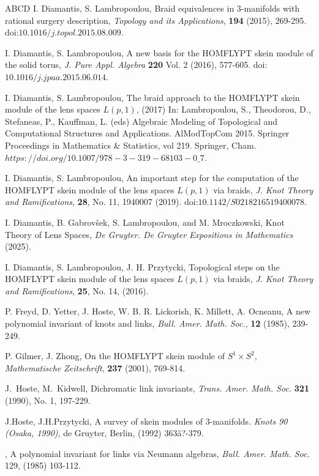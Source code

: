 \documentclass[11pt]{amsart}
\begin{document}
\begin{thebibliography}{ABCD}
 {\sc I. Diamantis, S. Lambropoulou}, Braid equivalences in 3-manifolds 
with rational surgery description, {\em Topology and its Applications}, {\bf 194} (2015), 269-295. doi:$10.1016/j.topol.2015.08.009$.

 {\sc I. Diamantis, S. Lambropoulou}, A new basis for the HOMFLYPT skein module of the solid torus, {\em J. Pure Appl. Algebra} {\bf 220} Vol. 2 (2016), 577-605. doi:$10.1016/j.jpaa.2015.06.014$.

 {\sc I. Diamantis, S. Lambropoulou}, The braid approach to the HOMFLYPT skein module of the lens spaces $L(p, 1)$, (2017) In: Lambropoulou, S., Theodorou, D., Stefaneas, P., Kauffman, L. (eds) Algebraic Modeling of Topological and Computational Structures and Applications. AlModTopCom 2015. Springer Proceedings in Mathematics \& Statistics, vol 219. Springer, Cham. $https://doi.org/10.1007/978-3-319-68103-0\_7$.

 {\sc I. Diamantis, S. Lambropoulou}, An important step for the computation of the HOMFLYPT skein module of the lens spaces $L(p,1)$ via braids, {\em J. Knot Theory and Ramifications}, {\bf 28}, No. 11, 1940007 (2019). doi:$10.1142/S0218216519400078$.

 {\sc I. Diamantis, B. Gabrov\v sek, S. Lambropoulou, and M. Mroczkowski}, Knot Theory of Lens Spaces, {\em De Gruyter. De Gruyter Expositions in Mathematics} (2025).

 {\sc I. Diamantis, S. Lambropoulou, J. H. Przytycki}, Topological steps on the HOMFLYPT skein module of the lens spaces $L(p,1)$ via braids, {\it J. Knot Theory and Ramifications}, {\bf 25}, No. 14, (2016).

 {\sc P. Freyd, D. Yetter, J. Hoste, W. B. R. Lickorish, K. Millett, A. Ocneanu}, A new polynomial invariant of knots and links, {\em Bull. Amer. Math. Soc.}, {\bf 12} (1985), 239-249.

 {\sc P. Gilmer, J. Zhong}, On the HOMFLYPT skein module of $S^1\times S^2$, {\em Mathematische Zeitschrift}, {\bf 237} (2001), 769-814.

 {\sc J.~Hoste, M.~Kidwell}, Dichromatic link invariants, {\it Trans. Amer. Math. Soc.} {\bf 321} (1990), No. 1, 197-229.

 {\sc J.Hoste, J.H.Przytycki}, A survey of skein modules of 3-manifolds. {\it Knots 90 (Osaka, 1990)}, de Gruyter, Berlin, (1992) 363â?-379.

, A polynomial invariant for links via Neumann algebras, {\it Bull. Amer. Math. Soc.} {129},
(1985) 103-112.


\end{thebibliography}
\end{document}
